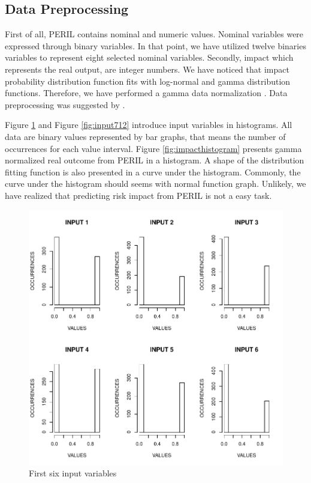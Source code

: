 \documentclass[a4paper,twoside]{article}
\begin{document}
\subsection{Data Preprocessing}
\label{sec:datapreprocessing}

\noindent First of all, PERIL contains nominal and numeric values. Nominal variables were expressed through binary variables. In that point, we have utilized twelve binaries variables to represent eight selected nominal variables. Secondly, impact which represents the real output, are integer numbers. We have noticed that impact probability distribution function fits with log-normal and gamma distribution functions. Therefore, we have performed a gamma data normalization \cite{han2006data}. Data preprocessing was suggested by \cite{valenca2005aplicando}.

Figure \ref{fig:input16} and Figure \ref{fig:input712} introduce input variables in histograms. All data are binary values represented by bar graphs, that means the number of occurrences for each value interval. Figure \ref{fig:impacthistogram} presents gamma normalized real outcome from PERIL in a histogram. A shape of the distribution fitting function is also presented in a curve under the histogram. Commonly, the curve under the histogram should seems with normal function graph. Unlikely, we have realized that predicting risk impact from PERIL is not a easy task.

\begin{figure}[!h]
  \vspace{-0.2cm}
  \centering
  \includegraphics[width=\columnwidth]{images/input1_6.pdf}
  \caption{First six input variables}
  \label{fig:input16}
\end{figure}
\end{document}
